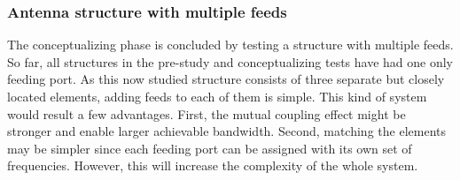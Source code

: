 \subsubsection{Antenna structure with multiple feeds}
\label{sec:multiple_feeds}
The conceptualizing phase is concluded by testing a structure with multiple feeds. So far, all structures in the pre-study and conceptualizing tests have had one only feeding port. As this now studied structure consists of three separate but closely located elements, adding feeds to each of them is simple. This kind of system would result a few advantages. First, the mutual coupling effect might be stronger and enable larger achievable bandwidth. Second, matching the elements may be simpler since each feeding port can be assigned with its own set of frequencies. However, this will increase the complexity of the whole system.

